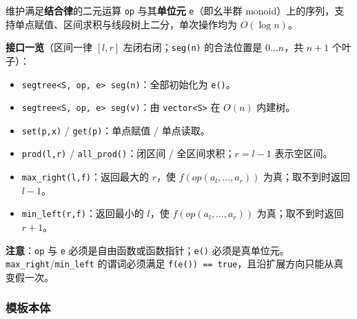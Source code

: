 		维护满足\textbf{结合律}的二元运算 \texttt{op} 与其\textbf{单位元} \texttt{e}（即幺半群 monoid）上的序列，支持单点赋值、区间求积与线段树上二分，单次操作均为 $O(\log n)$。

		\textbf{接口一览}（区间一律 $[l,r]$ 左闭右闭；\texttt{seg(n)} 的合法位置是 $0\dots n$，共 $n+1$ 个叶子）：

		\begin{itemize}
			\item \texttt{segtree<S, op, e> seg(n)}：全部初始化为 \texttt{e()}。
			\item \texttt{segtree<S, op, e> seg(v)}：由 \texttt{vector<S>} 在 $O(n)$ 内建树。
			\item \texttt{set(p,x)} / \texttt{get(p)}：单点赋值 / 单点读取。
			\item \texttt{prod(l,r)} / \texttt{all\_prod()}：闭区间 / 全区间求积；$r=l-1$ 表示空区间。
			\item \texttt{max\_right(l,f)}：返回最大的 $r$，使 $f(op(a_l,\dots,a_r))$ 为真；取不到时返回 $l-1$。
			\item \texttt{min\_left(r,f)}：返回最小的 $l$，使 $f(op(a_l,\dots,a_r))$ 为真；取不到时返回 $r+1$。
		\end{itemize}

		\textbf{注意}：\texttt{op} 与 \texttt{e} 必须是自由函数或函数指针；\texttt{e()} 必须是真单位元。\texttt{max\_right}/\texttt{min\_left} 的谓词必须满足 \texttt{f(e()) == true}，且沿扩展方向只能从真变假一次。

		\subsubsection{模板本体}

